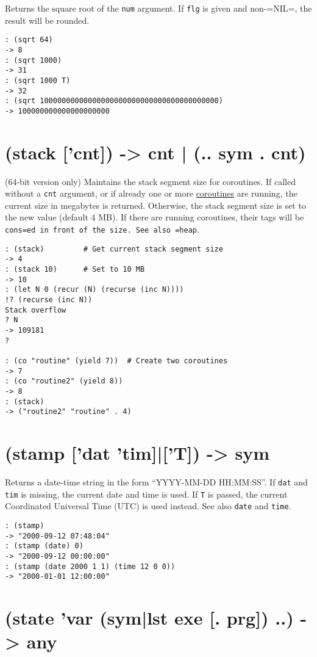 {{{{{{{{Returns the square root of the \texttt{num} argument. If \texttt{flg} is given and
non-=NIL=, the result will be rounded.


\begin{verbatim}
: (sqrt 64)
-> 8
: (sqrt 1000)
-> 31
: (sqrt 1000 T)
-> 32
: (sqrt 10000000000000000000000000000000000000000)
-> 100000000000000000000
\end{verbatim}

 
\section{(stack ['cnt]) -> cnt | (.. sym . cnt)}
\label{sec-8-1-19-32}


(64-bit version only) Maintains the stack segment size for coroutines.
If called without a \texttt{cnt} argument, or if already one or more
\hyperref[ref.html-coroutines]{coroutines} are running, the current size in
megabytes is returned. Otherwise, the stack segment size is set to the
new value (default 4 MB). If there are running coroutines, their tags
will be \texttt{cons=ed in front of the size. See also =heap}.


\begin{verbatim}
: (stack)         # Get current stack segment size
-> 4
: (stack 10)      # Set to 10 MB
-> 10
: (let N 0 (recur (N) (recurse (inc N))))
!? (recurse (inc N))
Stack overflow
? N
-> 109181
?

: (co "routine" (yield 7))  # Create two coroutines
-> 7
: (co "routine2" (yield 8))
-> 8
: (stack)
-> ("routine2" "routine" . 4)
\end{verbatim}

 
\section{(stamp ['dat 'tim]|['T]) -> sym}
\label{sec-8-1-19-33}


Returns a date-time string in the form ``YYYY-MM-DD HH:MM:SS''. If \texttt{dat}
and \texttt{tim} is missing, the current date and time is used. If \texttt{T} is
passed, the current Coordinated Universal Time (UTC) is used instead.
See also \texttt{date} and \texttt{time}.


\begin{verbatim}
: (stamp)
-> "2000-09-12 07:48:04"
: (stamp (date) 0)
-> "2000-09-12 00:00:00"
: (stamp (date 2000 1 1) (time 12 0 0))
-> "2000-01-01 12:00:00"
\end{verbatim}

 
\section{(state 'var (sym|lst exe [. prg]) ..) -> any}
\label{sec-8-1-19-34}


}}}}}}}}
